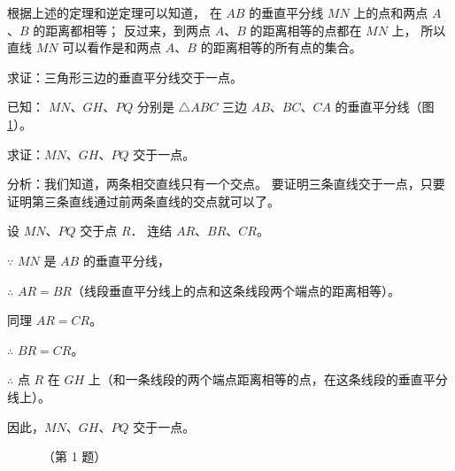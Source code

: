 根据上述的定理和逆定理可以知道，
在 $AB$ 的垂直平分线 $MN$ 上的点和两点 $A$、$B$ 的距离都相等；
反过来，到两点 $A$、$B$ 的距离相等的点都在 $MN$ 上，
所以直线 $MN$ 可以看作是和两点 $A$、$B$ 的距离相等的所有点的集合。


\liti[0] 求证：三角形三边的垂直平分线交于一点。

已知： $MN$、$GH$、$PQ$ 分别是 $\triangle ABC$ 三边 $AB$、$BC$、$CA$ 的垂直平分线（图 \ref{fig:czjh1-3-56}）。

求证：$MN$、$GH$、$PQ$ 交于一点。

分析：我们知道，两条相交直线只有一个交点。
要证明三条直线交于一点，只要证明第三条直线通过前两条直线的交点就可以了。

\zhengming 设 $MN$、$PQ$ 交于点 $R$． 连结 $AR$、$BR$、$CR$。

$\because$ \quad $MN$ 是 $AB$ 的垂直平分线，

$\therefore$ \quad $AR = BR$（线段垂直平分线上的点和这条线段两个端点的距离相等）。

同理 \quad $AR = CR$。

$\therefore$ \quad $BR = CR$。

$\therefore$ \quad 点 $R$ 在 $GH$ 上（和一条线段的两个端点距离相等的点，在这条线段的垂直平分线上）。

因此，$MN$、$GH$、$PQ$ 交于一点。

\begin{figure}[htbp]
    \centering
    \begin{minipage}[b]{7cm}
        \centering
        
        \caption{}\label{fig:czjh1-3-56}
    \end{minipage}
    \qquad
    \begin{minipage}[b]{7cm}
        \centering
        
        \caption*{（第 1 题）}
    \end{minipage}
\end{figure}

\begin{lianxi}



\end{lianxi}

